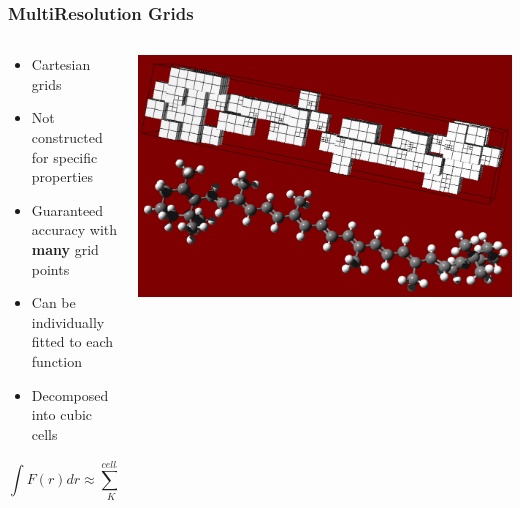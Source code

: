 \begin{frame}
    \frametitle{MultiResolution Grids}
    \begin{columns}
    \begin{column}{0.5\linewidth}
    \begin{itemize}
        \item Cartesian grids
        \item Not constructed for specific properties
        \item Guaranteed accuracy with \textbf{many} grid points
        \item Can be individually fitted to each function
        \item Decomposed into cubic cells
    \end{itemize}

    \vspace{5mm}

    \begin{equation}
        \nonumber
        \int F(r) dr \approx \sum_K^{cells} \sum_i^{grid} \omega_K(r_i) F(r_i)
    \end{equation}
    \end{column}

    \begin{column}{0.5\linewidth}
    \centering
    \includegraphics[angle=-90, scale=0.2]{figures/caroteneGrid.pdf}
    \end{column}
    \end{columns}
\end{frame}

